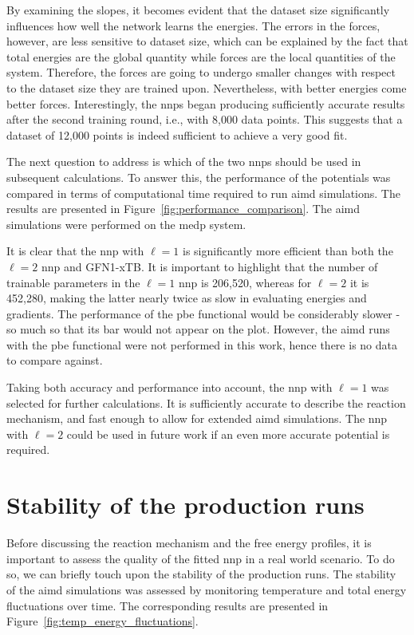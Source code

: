 By examining the slopes, it becomes evident that the dataset size significantly influences how well the network learns the energies. The errors in the forces, however, are less sensitive to dataset size, which can be explained by the fact that total energies are the global quantity while forces are the local quantities of the system. Therefore, the forces are going to undergo smaller changes with respect to the dataset size they are trained upon. Nevertheless, with better energies come better forces. Interestingly, the \acp{nnp} began producing sufficiently accurate results after the second training round, i.e., with 8,000 data points. This suggests that a dataset of 12,000 points is indeed sufficient to achieve a very good fit.

The next question to address is which of the two \acp{nnp} should be used in subsequent calculations. To answer this, the performance of the potentials was compared in terms of computational time required to run \ac{aimd} simulations. The results are presented in Figure~\ref{fig:performance_comparison}. The \ac{aimd} simulations were performed on the \ac{medp} system.

It is clear that the \ac{nnp} with $\ell=1$ is significantly more efficient than both the $\ell=2$ \ac{nnp} and GFN1-xTB. It is important to highlight that the number of trainable parameters in the $\ell=1$ \ac{nnp} is 206,520, whereas for $\ell=2$ it is 452,280, making the latter nearly twice as slow in evaluating energies and gradients. The performance of the \ac{pbe} functional would be considerably slower - so much so that its bar would not appear on the plot. However, the \ac{aimd} runs with the \ac{pbe} functional were not performed in this work, hence there is no data to compare against.

Taking both accuracy and performance into account, the \ac{nnp} with $\ell=1$ was selected for further calculations. It is sufficiently accurate to describe the reaction mechanism, and fast enough to allow for extended \ac{aimd} simulations. The \ac{nnp} with $\ell=2$ could be used in future work if an even more accurate potential is required.



\section{Stability of the production runs}
Before discussing the reaction mechanism and the free energy profiles, it is important to assess the quality of the fitted \ac{nnp} in a real world scenario. To do so, we can briefly touch upon the stability of the production runs. The stability of the \ac{aimd} simulations was assessed by monitoring temperature and total energy fluctuations over time. The corresponding results are presented in Figure~\ref{fig:temp_energy_fluctuations}.

